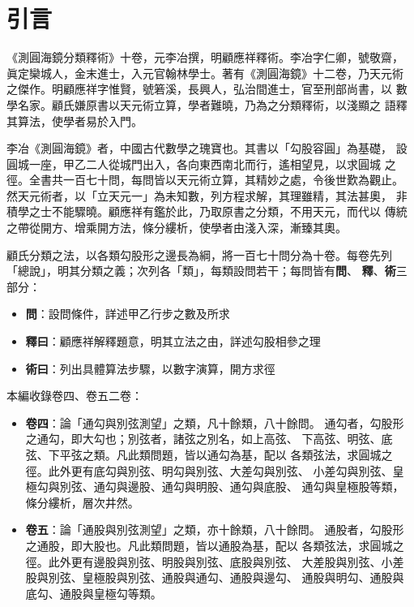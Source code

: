\documentclass[11pt,a4paper]{article}
\begin{document}
\section*{引言}

《測圓海鏡分類釋術》十卷，元李冶撰，明顧應祥釋術。李冶字仁卿，號敬齋，
眞定欒城人，金末進士，入元官翰林學士。著有《測圓海鏡》十二卷，乃天元術
之傑作。明顧應祥字惟賢，號箬溪，長興人，弘治間進士，官至刑部尚書，以
數學名家。顧氏嫌原書以天元術立算，學者難曉，乃為之分類釋術，以淺顯之
語釋其算法，使學者易於入門。

李冶《測圓海鏡》者，中國古代數學之瑰寶也。其書以「勾股容圓」為基礎，
設圓城一座，甲乙二人從城門出入，各向東西南北而行，遙相望見，以求圓城
之徑。全書共一百七十問，每問皆以天元術立算，其精妙之處，令後世歎為觀止。
然天元術者，以「立天元一」為未知數，列方程求解，其理雖精，其法甚奧，
非積學之士不能驟曉。顧應祥有鑑於此，乃取原書之分類，不用天元，而代以
傳統之帶從開方、增乘開方法，條分縷析，使學者由淺入深，漸臻其奧。

顧氏分類之法，以各類勾股形之邊長為綱，將一百七十問分為十卷。每卷先列
「總說」，明其分類之義；次列各「類」，每類設問若干；每問皆有\textbf{問}、
\textbf{釋}、\textbf{術}三部分：
\begin{itemize}
  \item \textbf{問}：設問條件，詳述甲乙行步之數及所求
  \item \textbf{釋曰}：顧應祥解釋題意，明其立法之由，詳述勾股相參之理
  \item \textbf{術曰}：列出具體算法步驟，以數字演算，開方求徑
\end{itemize}

本編收錄卷四、卷五二卷：
\begin{itemize}
  \item \textbf{卷四}：論「通勾與別弦測望」之類，凡十餘類，八十餘問。
    通勾者，勾股形之通勾，即大勾也；別弦者，諸弦之別名，如上高弦、
    下高弦、明弦、底弦、下平弦之類。凡此類問題，皆以通勾為基，配以
    各類弦法，求圓城之徑。此外更有底勾與別弦、明勾與別弦、大差勾與別弦、
    小差勾與別弦、皇極勾與別弦、通勾與邊股、通勾與明股、通勾與底股、
    通勾與皇極股等類，條分縷析，層次井然。
  \item \textbf{卷五}：論「通股與別弦測望」之類，亦十餘類，八十餘問。
    通股者，勾股形之通股，即大股也。凡此類問題，皆以通股為基，配以
    各類弦法，求圓城之徑。此外更有邊股與別弦、明股與別弦、底股與別弦、
    大差股與別弦、小差股與別弦、皇極股與別弦、通股與通勾、通股與邊勾、
    通股與明勾、通股與底勾、通股與皇極勾等類。
\end{itemize}
\end{document}
